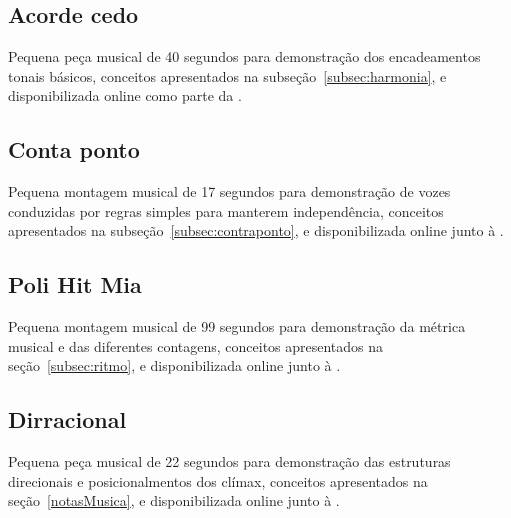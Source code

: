 \clearpage

\subsection{Acorde cedo}\label{ap:acorde}
Pequena peça musical de 40 segundos para demonstração dos encadeamentos tonais básicos, conceitos apresentados na subseção~\ref{subsec:harmonia}, e disponibilizada online como parte da \massa.\cite{MASSA}


\subsection{Conta ponto}\label{ap:conta}
Pequena montagem musical de 17 segundos para demonstração de vozes conduzidas por regras simples para manterem independência, conceitos apresentados na subseção~\ref{subsec:contraponto}, e disponibilizada online junto à \massa.\cite{MASSA}




\subsection{Poli Hit Mia}\label{ap:poli}
Pequena montagem musical de 99 segundos para demonstração da métrica musical e das diferentes contagens, conceitos apresentados na seção~\ref{subsec:ritmo}, e disponibilizada online junto à \massa.\cite{MASSA}



\subsection{Dirracional}\label{ap:dirracional}
Pequena peça musical de 22 segundos para demonstração das estruturas direcionais e posicionalmentos dos clímax, conceitos apresentados na seção~\ref{notasMusica}, e disponibilizada online junto à \massa.\cite{MASSA}


